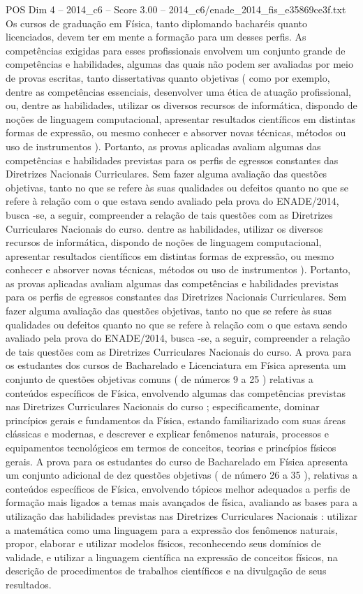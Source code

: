\begin{textsample}{POS Dim 4 – 2014\_c6 – Score 3.00 – 2014\_c6/enade\_2014\_fis\_e35869ce3f.txt}
Os cursos de graduação em Física, tanto diplomando bacharéis quanto licenciados, devem ter em mente a formação para um desses perfis.
As competências exigidas para esses profissionais envolvem um conjunto grande de competências e habilidades, algumas das quais não podem ser avaliadas por meio de provas escritas, tanto dissertativas quanto objetivas ( como por exemplo, dentre as competências essenciais, desenvolver uma ética de atuação profissional, ou, dentre as habilidades, utilizar os diversos recursos de informática, dispondo de noções de linguagem computacional, apresentar resultados científicos em distintas formas de expressão, ou mesmo conhecer e absorver novas técnicas, métodos ou uso de instrumentos ).
Portanto, as provas aplicadas avaliam algumas das competências e habilidades previstas para os perfis de egressos constantes das Diretrizes Nacionais Curriculares.
Sem fazer alguma avaliação das questões objetivas, tanto no que se refere às suas qualidades ou defeitos quanto no que se refere à relação com o que estava sendo avaliado pela prova do ENADE/2014, busca -se, a seguir, compreender a relação de tais questões com as Diretrizes Curriculares Nacionais do curso. dentre as habilidades, utilizar os diversos recursos de informática, dispondo de noções de linguagem computacional, apresentar resultados científicos em distintas formas de expressão, ou mesmo conhecer e absorver novas técnicas, métodos ou uso de instrumentos ).
Portanto, as provas aplicadas avaliam algumas das competências e habilidades previstas para os perfis de egressos constantes das Diretrizes Nacionais Curriculares.
Sem fazer alguma avaliação das questões objetivas, tanto no que se refere às suas qualidades ou defeitos quanto no que se refere à relação com o que estava sendo avaliado pela prova do ENADE/2014, busca -se, a seguir, compreender a relação de tais questões com as Diretrizes Curriculares Nacionais do curso.
A prova para os estudantes dos cursos de Bacharelado e Licenciatura em Física apresenta um conjunto de questões objetivas comuns ( de números 9 a 25 ) relativas a conteúdos específicos de Física, envolvendo algumas das competências previstas nas Diretrizes Curriculares Nacionais do curso ; especificamente, dominar princípios gerais e fundamentos da Física, estando familiarizado com suas áreas clássicas e modernas, e descrever e explicar fenômenos naturais, processos e equipamentos tecnológicos em termos de conceitos, teorias e princípios físicos gerais.
A prova para os estudantes do curso de Bacharelado em Física apresenta um conjunto adicional de dez questões objetivas ( de número 26 a 35 ), relativas a conteúdos específicos de Física, envolvendo tópicos melhor adequados a perfis de formação mais ligados a temas mais avançados de física, avaliando as bases para a utilização das habilidades previstas nas Diretrizes Curriculares Nacionais : utilizar a matemática como uma linguagem para a expressão dos fenômenos naturais, propor, elaborar e utilizar modelos físicos, reconhecendo seus domínios de validade, e utilizar a linguagem científica na expressão de conceitos físicos, na descrição de procedimentos de trabalhos científicos e na divulgação de seus resultados.

\end{textsample}
